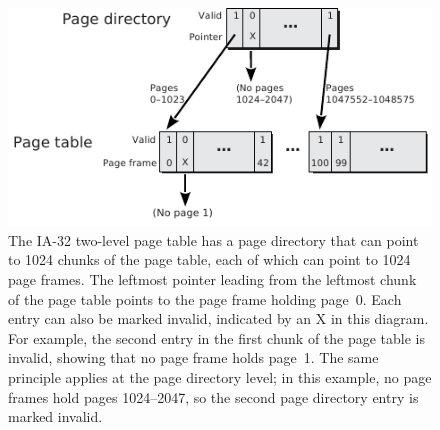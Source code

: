 \begin{figure}
\centerline{\includegraphics{hail_f0613}}

\caption{The IA-32 two-level page table has a page directory that can
  point to 1024 chunks of the page table, each of which can point to 1024 page
  frames.  The leftmost pointer leading from the leftmost chunk of the
  page table
  points to the page frame holding page~0.  Each entry can also be
  marked invalid, indicated by an X in this diagram. For example, the
  second entry in the first chunk of the page table is invalid, showing that no
  page frame holds page~1.  The same principle applies at the page
  directory level; in this example, no page frames hold pages 1024--2047, so the second page directory entry is marked invalid.}
\label{IA-32-page-table}
\end{figure}

